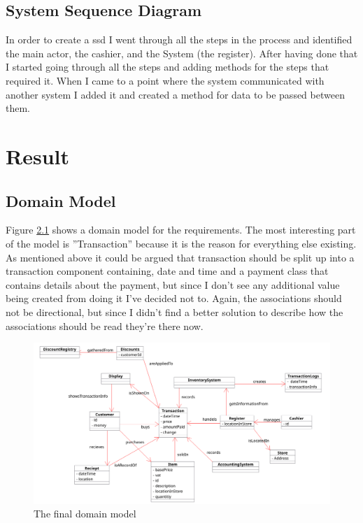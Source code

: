 \documentclass[a4paper]{scrreprt}
\begin{document}
    \section{System Sequence Diagram}
        In order to create a ssd I went through all the steps in the process and 
        identified the main actor, the cashier, and the System (the register). After
        having done that I started going through all the steps and adding methods 
        for the steps that required it. When I came to a point where the system 
        communicated with another system I added it and created a method for data
        to be passed between them.

\chapter{Result}
    \label{sec:result}

    
    \section{Domain Model}
        Figure \ref{fig:dm} shows a domain model for the requirements. The most interesting
        part of the model is ''Transaction'' because it is the reason for everything else
        existing. As mentioned above it could be argued that transaction should be split up
        into a transaction component containing, date and time and a payment class that
        contains details about the payment, but since I don't see any additional value being
        created from doing it I've decided not to. Again, the associations should not be
        directional, but since I didn't find a better solution to describe how the associations
        should be read they're there now.
        
        \begin{figure}[ht!]
            \begin{center}
                \includegraphics[scale=0.3]{dm1.png}
                \caption{The final domain model}
                \label{fig:dm}
            \end{center}
        \end{figure}
    
\end{document}

